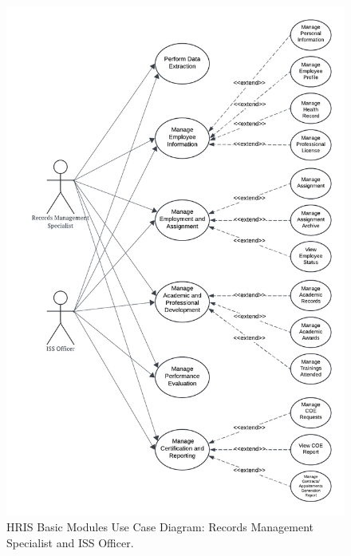     \begin{figure}[H]
        \centering
        \includegraphics[width=0.9\linewidth]{figures/images/use-case-basic-4.png}
        \caption{HRIS Basic Modules Use Case Diagram: Records Management Specialist and ISS Officer.}
        \label{fig:use-case-basic-4}
    \end{figure}

